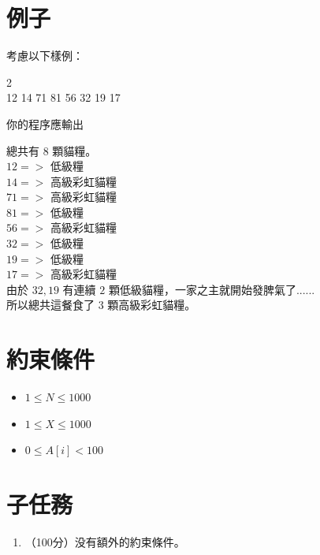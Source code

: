 \documentclass[18pt]{article}
\newenvironment{codeblock}{\begin{tcolorbox}[arc=1pt,outer arc=1pt,boxrule=0.5pt,colback=fillinggray,colframe=outlinegray] \ttfamily}{\end{tcolorbox}}
\begin{document}
    \section*{例子}

    考慮以下樣例：  
    \begin{codeblock}
        8 2\\
        12 14 71 81 56 32 19 17
    \end{codeblock}
    你的程序應輸出
    \begin{codeblock}
        3
    \end{codeblock}
    總共有 $8$ 顆貓糧。\\

    $12 =>$ 低級糧\\
    $14 =>$ 高級彩虹貓糧\\
    $71 =>$ 高級彩虹貓糧\\
    $81 =>$ 低級糧\\
    $56 =>$ 高級彩虹貓糧\\
    $32 =>$ 低級糧\\
    $19 =>$ 低級糧\\
    $17 =>$ 高級彩虹貓糧\\

    由於 $32, 19$ 有連續 $2$ 顆低級貓糧，一家之主就開始發脾氣了......\\
    所以總共這餐食了 $3$ 顆高級彩虹貓糧。\\
    
    \section*{約束條件}
    \begin{itemize}
        \item $1 \le N \le 1000$
        \item $1 \le X \le 1000$
        \item $0 \le A[i] < 100$
    \end{itemize}

    \section*{子任務}
    \begin{enumerate}
        \item （100分）没有額外的約束條件。
    \end{enumerate}
\end{document}
